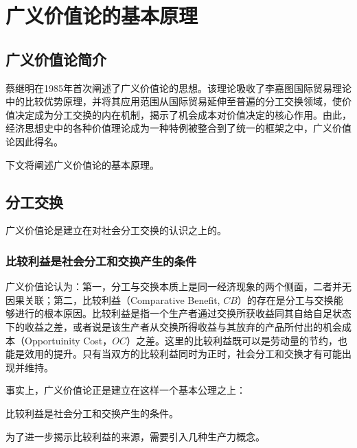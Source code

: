 
\chapter{广义价值论的基本原理}

\section{广义价值论简介}

蔡继明在1985年首次阐述了广义价值论的思想\cite{CaiJiMingBiJiaoLiYiShuoYuLaoDongJieZhiLun1985}。该理论吸收了李嘉图国际贸易理论中的比较优势原理，并将其应用范围从国际贸易延伸至普遍的分工交换领域，使价值决定成为分工交换的内在机制，揭示了机会成本对价值决定的核心作用。由此，经济思想史中的各种价值理论成为一种特例被整合到了统一的框架之中，广义价值论因此得名\cite[221]{LiRenJunJieZhiLiLun2004}。

下文将阐述广义价值论的基本原理。

\section{分工交换}

广义价值论是建立在对社会分工交换的认识之上的。

\subsection{比较利益是社会分工和交换产生的条件}

广义价值论认为：第一，分工与交换本质上是同一经济现象的两个侧面，二者并无因果关联；第二，比较利益（Comparative Benefit, $\mathit{CB}$）的存在是分工与交换能够进行的根本原因。比较利益是指一个生产者通过交换所获收益同其自给自足状态下的收益之差，或者说是该生产者从交换所得收益与其放弃的产品所付出的机会成本（Opportuinity Cost，$\mathit{OC}$）之差。这里的比较利益既可以是劳动量的节约，也能是效用的提升。只有当双方的比较利益同时为正时，社会分工和交换才有可能出现并维持\cite[32]{CaiJiMingLunFenGongYuJiaoHuanDeQiYuanHeJiaoHuanBiLiDeQueDingGuangYiJieZhiLunGangShang1999}。

事实上，广义价值论正是建立在这样一个基本公理之上：
\begin{axiom}
    \label{Bijiaoliyishishehuifengonghejiaohuanchanshengdetiaojian}
    比较利益是社会分工和交换产生的条件。
\end{axiom}

为了进一步揭示比较利益的来源，需要引入几种生产力概念。

